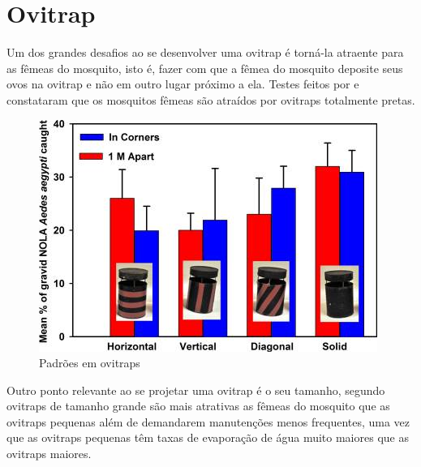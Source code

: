 \documentclass[
	12pt,				%
	openright,			%
	oneside,			%
	a4paper,			%
	chapter=TITLE,		%
	english,			%
	brazil				%
	]{abntex2}
\begin{document}
\section{Ovitrap}
Um dos grandes desafios ao se desenvolver uma ovitrap é torná-la atraente para as fêmeas do mosquito, isto é, fazer com que a fêmea 
do mosquito deposite seus ovos na ovitrap 
e não em outro lugar próximo a ela. Testes feitos por \cite{DAVIDF2011} e \cite{VALERIE2016} constataram que os mosquitos fêmeas 
são atraídos por ovitraps totalmente pretas.

\begin{figure}[H]
\centering
\includegraphics[scale=0.8]{imagens/tileshop.jpeg}
\caption{Padrões em ovitraps}
\end{figure}

Outro ponto relevante ao se projetar uma ovitrap é o seu tamanho, segundo \cite{BRIANJJOHNSON2017} ovitraps de tamanho grande são 
mais atrativas as fêmeas do mosquito
 que as ovitraps pequenas além de demandarem manutenções menos frequentes, uma vez que as ovitraps pequenas têm taxas de evaporação 
 de água muito maiores que as ovitraps maiores.

\newpage
\end{document}
